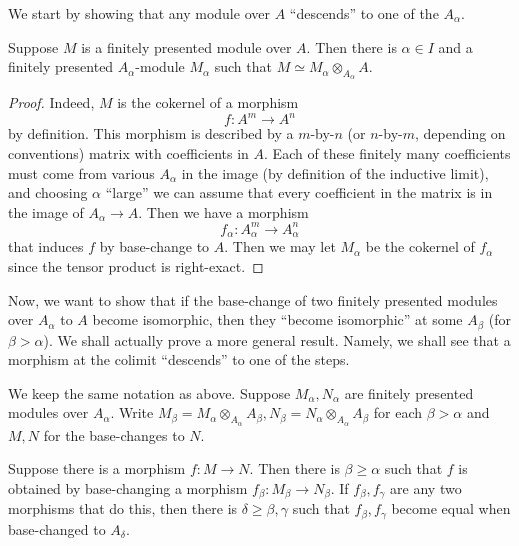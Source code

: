 We start by showing that any module over $A$ ``descends'' to one of the
$A_\alpha$.
\begin{proposition} 
Suppose $M$ is a finitely presented module over $A$. Then there is $\alpha \in
I$ and a finitely presented $A_\alpha$-module $M_\alpha$ such that $M \simeq
M_\alpha \otimes_{A_\alpha} A$. 
\end{proposition} 
\begin{proof} 
Indeed, $M$ is the cokernel of a morphism
\[ f: A^m \to A^n   \]
by definition. This morphism is described by a $m$-by-$n$ (or $n$-by-$m$,
depending on conventions) matrix with coefficients in $A$. Each of these
finitely many coefficients must come from various $A_\alpha$ in the image (by
definition of the inductive limit), and choosing $\alpha$ ``large'' we can
assume that every coefficient in the matrix is in the image of $A_\alpha \to A$.
Then we have a morphism
\[ f_\alpha:  A_\alpha^m \to A_\alpha^n  \]
that induces $f$ by base-change to $A$. Then we may let $M_\alpha$ be the
cokernel of $f_\alpha$ since the tensor product is right-exact.
\end{proof} 

Now, we want to show that if the base-change of two finitely presented modules
over $A_\alpha$ to $A$ become isomorphic, then they ``become isomorphic'' at some
$A_\beta $ (for $\beta > \alpha$).
We shall actually prove a more general result.
Namely, we shall see that 
a morphism at the colimit ``descends'' to one of the steps.

\begin{proposition} We keep the same notation as above.
Suppose $M_\alpha, N_\alpha$ are finitely presented modules over $A_\alpha$.
Write $M_\beta = M_\alpha \otimes_{A_\alpha} A_\beta, N_\beta = N_\alpha
\otimes_{A_\alpha} A_\beta$ for each $\beta > \alpha$ and $M, N$ for the
base-changes to $N$.

Suppose there is a morphism $f: M \to N$. Then there is $\beta \geq \alpha$ such
that $f$ is obtained by base-changing a morphism $f_\beta: M_\beta \to N_\beta$.
If $f_\beta, f_\gamma$ are any two morphisms that do this, then there is
$\delta \geq \beta, \gamma$ such that $f_\beta, f_\gamma$ become equal when
base-changed to $A_\delta$.
\end{proposition} 

